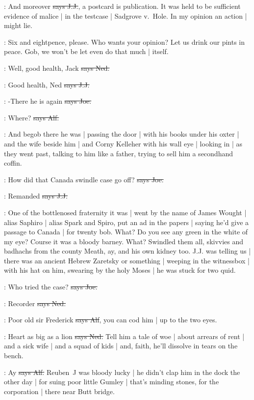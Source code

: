 \jjom:
And moreover
\sout{says J.J.},
a postcard is publication.
It was held to be sufficient evidence of malice |
in the testcase |
Sadgrove v.~Hole.
In my opinion an action |
might lie.

\Nq:
Six and eightpence,
please.
Who wants your opinion?
Let us drink our pints in peace.
Gob,
we won't be let even do that much |
itself.

\lambert:
Well,
good health,
Jack
\sout{says Ned.}

\jjom:
Good health,
Ned
\sout{says J.J.}

\joe:
-There he is again
\sout{says Joe.}

\bergan:
Where?
\sout{says Alf.}

\Nq:
And begob there he was |
passing the door |
with his books under his oxter |
and the wife beside him |
and Corny Kelleher with his wall eye |
looking in |
as they went past,
talking to him like a father,
trying to sell him a secondhand coffin.

\joe:
How did that Canada swindle case go off?
\sout{says Joe.}

\jjom:
Remanded
\sout{says J.J.}

\Nq:
One of the bottlenosed fraternity it was |
went by the name of James Wought |
alias Saphiro |
alias Spark and Spiro,
put an ad in the papers |
saying he'd give a passage to Canada |
for twenty bob.
What?
Do you see any green in the white of my eye?
Course it was a bloody barney.
What?
Swindled them all,
skivvies and badhachs from the county Meath,
ay,
and his own kidney too.
J.J. was telling us |
there was an ancient Hebrew Zaretsky or something |
weeping in the witnessbox |
with his hat on him,
swearing by the holy Moses |
he was stuck for two quid.

\joe:
Who tried the case?
\sout{says Joe.}

\lambert:
Recorder
\sout{says Ned.}

\bergan:
Poor old sir Frederick
\sout{says Alf},
you can cod him |
up to the two eyes.

\lambert:
Heart as big as a lion
\sout{says Ned.}
Tell him a tale of woe |
about arrears of rent |
and a sick wife |
and a squad of kids |
and,
faith,
he'll dissolve in tears on the bench.

\bergan:
Ay
\sout{says Alf.}
Reuben~J was bloody lucky |
he didn't clap him in the dock the other day |
for suing poor little Gumley |
that's minding stones,
for the corporation |
there near Butt bridge.

